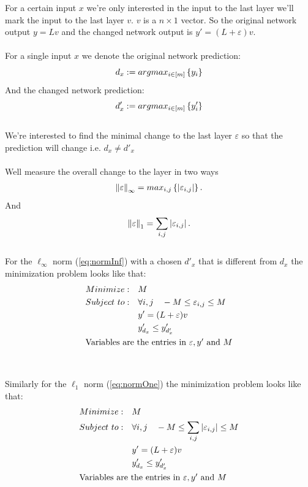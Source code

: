 \documentclass[a4paper]{easychair}
\begin{document}
For a certain input $x$ we're only interested in the input to the last layer we'll mark the input to the last layer $v$. $v$ is a $n\times 1$
vector.  So the original network output $y = Lv$ and the changed
network output is $y' = (L+\varepsilon)v$.
\\\\
For a single input $x$ we denote the original network prediction:
$$
   	d_x := argmax_{i\in \left[m\right]}\left\lbrace y_i\right\rbrace
$$
And the changed network prediction:
$$
   	d'_x := argmax_{i\in \left[m\right]}\left\lbrace y'_i\right\rbrace
$$
\\
We're interested to find the minimal change to the last layer $\varepsilon$  so that the prediction will change i.e. $d_x\neq d'_x$
\\\\
Well measure the overall change to the layer in two ways
\begin{equation}
\label{eq:normInf}
	\begin{split}
   		\left\lVert\varepsilon\right\rVert_{\infty}=max_{i,j}\left\lbrace \left\lvert\varepsilon_{i,j}\right\rvert\right\rbrace.
	\end{split}
\end{equation}
And
\begin{equation}
\label{eq:normOne}
	\begin{split}
   		\left\lVert\varepsilon\right\rVert_1=\sum_{i,j}\left\lvert\varepsilon_{i,j}\right\rvert.
	\end{split}
\end{equation}
\\
For the $\ell_\infty$ norm (\ref{eq:normInf}) with a chosen $d'_x$ that is different from $d_x$ the minimization problem looks like that:
\begin{equation}
\label{eq:LP}
\begin{split}
    Minimize:\quad & M \\
    Subject\ to:\quad & \forall i,j\quad -M \leq\varepsilon_{i,j}\leq M \\
    & y'=(L+\varepsilon)v \\
    & y'_{d_x} \leq y'_{d'_x} \\
	\intertext{Variables are the entries in $\varepsilon,y'$ and $M$}
\end{split}
\end{equation}
\\\\
Similarly for the $\ell_1$ norm (\ref{eq:normOne}) the minimization problem looks like that:
\begin{equation}
\label{eq:NotLP}
\begin{split}
    Minimize:\quad & M \\
    Subject\ to:\quad & \forall i,j\quad -M \leq\sum_{i,j}\left\lvert\varepsilon_{i,j}\right\rvert\leq M \\
    & y'=(L+\varepsilon)v \\
    & y'_{d_x} \leq y'_{d'_x} \\
	\intertext{Variables are the entries in $\varepsilon,y'$ and $M$}
\end{split}
\end{equation}
\end{document}
